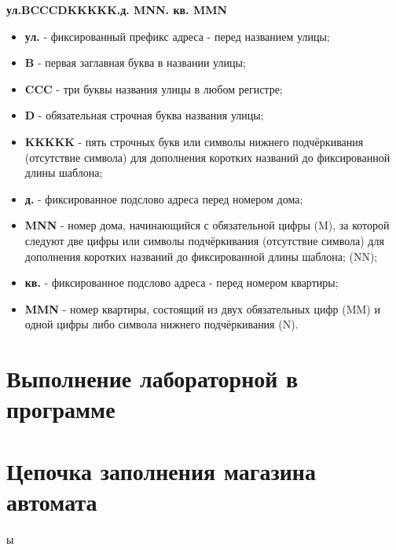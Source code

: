 \documentclass[oneside,a4paper,14pt]{extarticle}
\begin{document}
\begin{center}
	\textbf{ул.\textvisiblespace BCCCDKKKKK.\textvisiblespace д. \textvisiblespace MNN. \textvisiblespace кв. \textvisiblespace MMN}
\end{center}
\begin{itemize}
	\item \textbf{ул.\textvisiblespace} - фиксированный префикс адреса - перед названием улицы;
	\item \textbf{B} - первая заглавная буква в названии улицы;
	\item \textbf{CCC} - три буквы названия улицы в любом регистре;
	\item \textbf{D} - обязательная строчная буква названия улицы;
	\item \textbf{KKKKK} - пять строчных букв или символы нижнего подчёркивания (отсутствие символа) для дополнения коротких названий до фиксированной длины шаблона;
	\item \textbf{д. \textvisiblespace} - фиксированное подслово адреса перед номером дома;
	\item \textbf{MNN} - номер дома, начинающийся с обязательной цифры (M), за которой следуют две цифры или символы подчёркивания (отсутствие символа) для дополнения коротких названий до фиксированной длины шаблона; (NN);
	\item \textbf{кв. \textvisiblespace} - фиксированное подслово адреса - перед номером квартиры;
	\item \textbf{MMN} - номер квартиры, состоящий из двух обязательных цифр (MM) и одной цифры либо символа нижнего подчёркивания (N).
\end{itemize}

\newpage
\clearpage

\section*{Выполнение лабораторной в программе}

\section*{Цепочка заполнения магазина автомата}
ы
\end{document}
